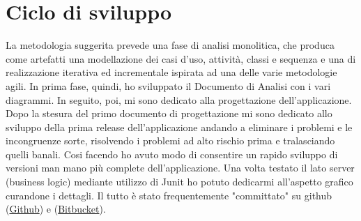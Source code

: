 \chapter{Ciclo di sviluppo}

La metodologia suggerita prevede una fase di analisi monolitica, che produca come artefatti una modellazione dei casi d'uso, attività, classi e sequenza e una di realizzazione iterativa ed incrementale ispirata ad una delle varie metodologie agili. In prima fase, quindi, ho sviluppato il Documento di Analisi con i vari diagrammi. In seguito, poi, mi sono dedicato alla progettazione dell'applicazione. Dopo la stesura del primo documento di progettazione mi sono dedicato allo sviluppo della prima release dell'applicazione andando a eliminare i problemi e le incongruenze sorte, risolvendo i problemi ad alto rischio prima e tralasciando quelli banali. Cosi facendo ho avuto modo di consentire un rapido sviluppo di versioni man mano più complete dell'applicazione. Una volta testato il lato server (business logic) mediante utilizzo di Junit ho potuto dedicarmi all'aspetto grafico curandone i dettagli. Il tutto è stato frequentemente "committato" su github (\href{https://github.com/jgemmy/Doodle}{Github}) e (\href{https://bitbucket.org/jgemmy/doodle}{Bitbucket}).
